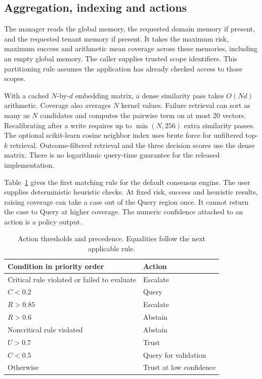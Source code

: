 \subsection{Aggregation, indexing and actions}

The manager reads the global memory, the requested domain memory if present,
and the requested tenant memory if present. It takes the maximum risk, maximum
success and arithmetic mean coverage across these memories, including an empty
global memory. The caller supplies trusted scope identifiers. This partitioning
rule assumes the application has already checked access to those scopes.

With a cached $N$-by-$d$ embedding matrix, a dense similarity pass takes
$O(Nd)$ arithmetic. Coverage also averages $N$ kernel values. Failure retrieval
can sort as many as $N$ candidates and computes the pairwise term on at most
20 vectors. Recalibrating after a write requires up to $\min(N,256)$ extra
similarity passes. The optional scikit-learn cosine neighbor index uses brute
force for unfiltered top-$k$ retrieval. Outcome-filtered retrieval and the
three decision scores use the dense matrix. There is no logarithmic query-time
guarantee for the released implementation.

Table~\ref{tab:release-policy} gives the first matching rule for the default
consensus engine. The user supplies deterministic heuristic checks. At fixed
risk, success and heuristic results, raising coverage can take a case out of
the Query region once. It cannot return the case to Query at higher coverage.
The numeric confidence attached to an action is a policy output.
\begin{table}[htbp]
\centering
\begin{tabular}{ll}
\toprule
Condition in priority order & Action\\
\midrule
Critical rule violated or failed to evaluate & Escalate\\
$C<0.2$ & Query\\
$R>0.85$ & Escalate\\
$R>0.6$ & Abstain\\
Noncritical rule violated & Abstain\\
$U>0.7$ & Trust\\
$C<0.5$ & Query for validation\\
Otherwise & Trust at low confidence\\
\bottomrule
\end{tabular}
\caption{Action thresholds and precedence. Equalities follow the next applicable rule.}
\label{tab:release-policy}
\end{table}

